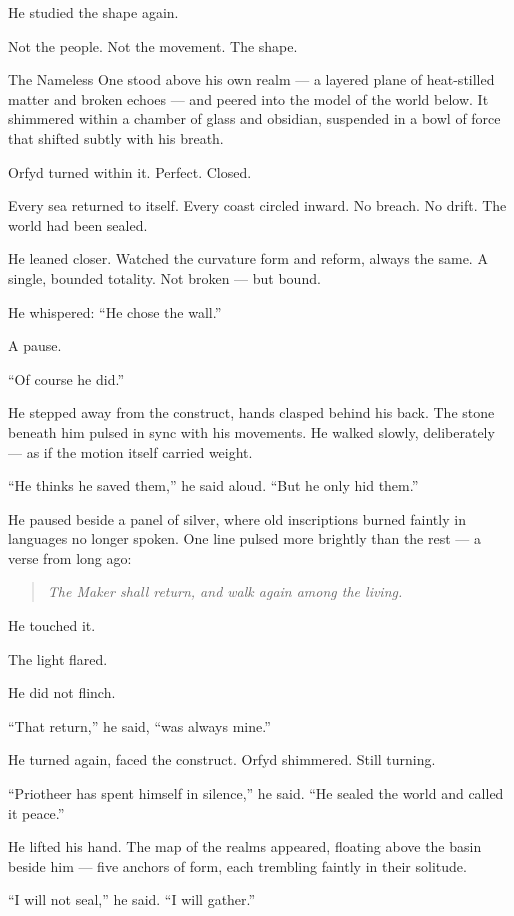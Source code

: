 \documentclass[9pt]{article}
\begin{document}
He studied the shape again.

Not the people. Not the movement. The shape.

The Nameless One stood above his own realm — a layered plane of heat-stilled matter and broken echoes — and peered into the model of the world below. It shimmered within a chamber of glass and obsidian, suspended in a bowl of force that shifted subtly with his breath.

Orfyd turned within it. Perfect. Closed.

Every sea returned to itself. Every coast circled inward. No breach. No drift. The world had been sealed.

He leaned closer. Watched the curvature form and reform, always the same. A single, bounded totality. Not broken — but bound.

He whispered: ``He chose the wall.''

A pause.

``Of course he did.''

He stepped away from the construct, hands clasped behind his back. The stone beneath him pulsed in sync with his movements. He walked slowly, deliberately — as if the motion itself carried weight.

``He thinks he saved them,'' he said aloud. ``But he only hid them.''

He paused beside a panel of silver, where old inscriptions burned faintly in languages no longer spoken. One line pulsed more brightly than the rest — a verse from long ago:

\begin{quote}
\emph{The Maker shall return, and walk again among the living.}
\end{quote}

He touched it.

The light flared.

He did not flinch.

``That return,'' he said, ``was always mine.''

He turned again, faced the construct. Orfyd shimmered. Still turning.

``Priotheer has spent himself in silence,'' he said. ``He sealed the world and called it peace.''

He lifted his hand. The map of the realms appeared, floating above the basin beside him — five anchors of form, each trembling faintly in their solitude.

``I will not seal,'' he said. ``I will gather.''
\end{document}
